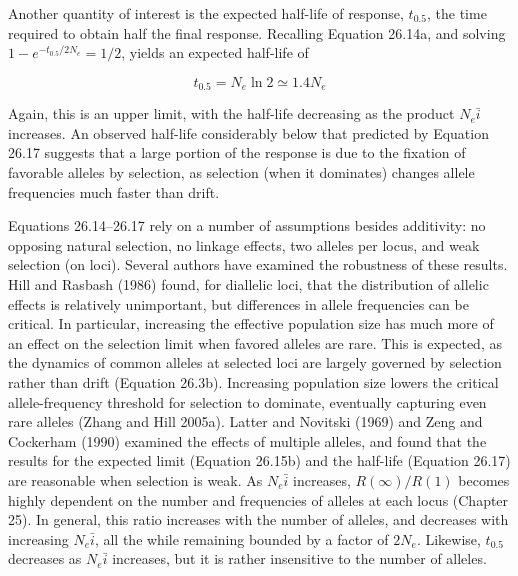 \documentclass{article}
\begin{document}
Another quantity of interest is the expected half-life of response,  $ t_{0.5} $, the time required to obtain half the final response. Recalling Equation 26.14a, and solving  $ 1 - e^{-t_{0.5}/2N_e} = 1/2 $, yields an expected half-life of

\begin{equation}
t_{0.5}=N_{e}\ln2\simeq1.4N_{e}
\tag{26.17}
\label{eq:26_17}
\end{equation}

Again, this is an upper limit, with the half-life decreasing as the product  $ N_{e}\bar{i} $ increases. An observed half-life considerably below that predicted by Equation 26.17 suggests that a large portion of the response is due to the fixation of favorable alleles by selection, as selection (when it dominates) changes allele frequencies much faster than drift.

Equations 26.14–26.17 rely on a number of assumptions besides additivity: no opposing natural selection, no linkage effects, two alleles per locus, and weak selection (on loci). Several authors have examined the robustness of these results. Hill and Rasbash (1986) found, for diallelic loci, that the distribution of allelic effects is relatively unimportant, but differences in allele frequencies can be critical. In particular, increasing the effective population size has much more of an effect on the selection limit when favored alleles are rare. This is expected, as the dynamics of common alleles at selected loci are largely governed by selection rather than drift (Equation 26.3b). Increasing population size lowers the critical allele-frequency threshold for selection to dominate, eventually capturing even rare alleles (Zhang and Hill 2005a). Latter and Novitski (1969) and Zeng and Cockerham (1990) examined the effects of multiple alleles, and found that the results for the expected limit (Equation 26.15b) and the half-life (Equation 26.17) are reasonable when selection is weak. As  $ N_{e}\bar{i} $ increases,  $ R(\infty)/R(1) $ becomes highly dependent on the number and frequencies of alleles at each locus (Chapter 25). In general, this ratio increases with the number of alleles, and decreases with increasing  $ N_{e}\bar{i} $, all the while remaining bounded by a factor of  $ 2N_{e} $. Likewise,  $ t_{0.5} $ decreases as  $ N_{e}\bar{i} $ increases, but it is rather insensitive to the number of alleles.
\end{document}
